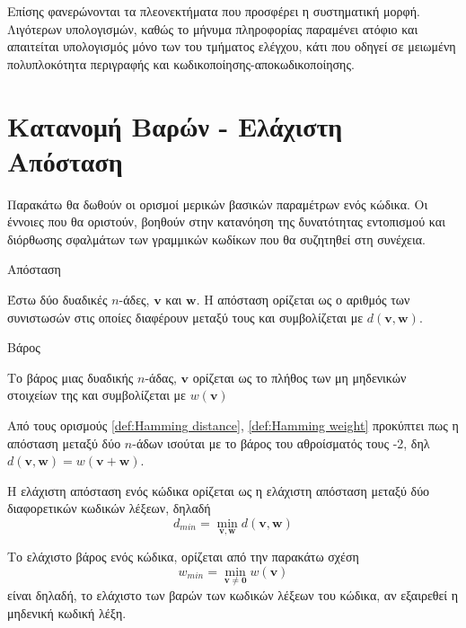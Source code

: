 Επίσης φανερώνονται τα πλεονεκτήματα που προσφέρει η συστηματική μορφή. Λιγότερων υπολογισμών, καθώς το μήνυμα πληροφορίας παραμένει ατόφιο και 
απαιτείται υπολογισμός μόνο των  του τμήματος ελέγχου, κάτι που οδηγεί σε μειωμένη πολυπλοκότητα περιγραφής και κωδικοποίησης-αποκωδικοποίησης.

\section{Κατανομή Βαρών - Ελάχιστη Απόσταση }

Παρακάτω θα δωθούν οι ορισμοί μερικών βασικών παραμέτρων ενός κώδικα. Οι έννοιες που θα οριστούν, βοηθούν στην κατανόηση της δυνατότητας εντοπισμού και διόρθωσης σφαλμάτων των γραμμικών  κωδίκων που θα συζητηθεί στη συνέχεια.

\begin{definition}Απόσταση 

Έστω δύο δυαδικές $n$-άδες, $\mathbf{v}$ και $\mathbf{w}$. Η απόσταση  ορίζεται ως ο αριθμός των συνιστωσών στις οποίες διαφέρουν μεταξύ τους και συμβολίζεται με $d\left(\mathbf{v},\mathbf{w}\right)$.
\label{def:Hamming distance}
\end{definition}

\begin{definition}Βάρος 

Το βάρος  μιας δυαδικής $n$-άδας, $\mathbf{v}$ ορίζεται ως το πλήθος των μη μηδενικών στοιχείων της και συμβολίζεται με $w\left(\mathbf{v}\right)$
\label{def:Hamming weight}
\end{definition}

Από τους ορισμούς \ref{def:Hamming distance}, \ref{def:Hamming weight} προκύπτει πως η απόσταση  μεταξύ δύο $n$-άδων ισούται με το βάρος του αθροίσματός τους -2, δηλ $d\left(\mathbf{v},\mathbf{w}\right) = w\left(\mathbf{v}+\mathbf{w}\right)$.

\begin{definition}
Η ελάχιστη απόσταση ενός κώδικα ορίζεται ως η ελάχιστη απόσταση  μεταξύ δύο διαφορετικών κωδικών λέξεων, δηλαδή
\begin{equation}
d_{min} = \min_{\mathbf{v}, \mathbf{w}}d\left(\mathbf{v}, \mathbf{w}\right)
\label{eq:min distance}
\end{equation}
\end{definition}

\begin{definition}
Το ελάχιστο βάρος ενός κώδικα, ορίζεται από την παρακάτω σχέση
\begin{equation}
w_{min} = \min_{\mathbf{v}\neq\mathbf{0}}w\left(\mathbf{v}\right)
\label{eq:min weight}
\end{equation}
είναι δηλαδή, το ελάχιστο των βαρών των κωδικών λέξεων του κώδικα, αν εξαιρεθεί η μηδενική κωδική λέξη.
\end{definition}

